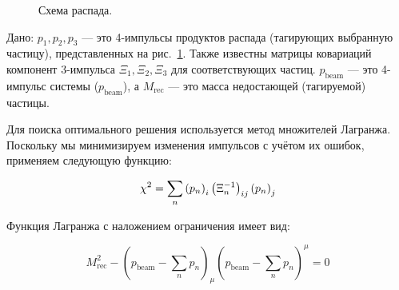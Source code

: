 
\begin{figure}[h!]
    \centering
    \caption{Схема распада.}
    \label{fit_tag}
\end{figure}

Дано: $p_1, p_2, p_3$ --- это 4-импульсы продуктов распада (тагирующих выбранную частицу), представленных на рис.~\ref{fit_tag}. 
Также известны матрицы ковариаций компонент 3-импульса $\Xi_1, \Xi_2, \Xi_3$ для соответствующих частиц. 
$p_{\text{beam}}$ — это 4-импульс системы ($p_{\text{beam}}$), а $M_{\text{rec}}$ --- это масса недостающей (тагируемой) частицы.

Для поиска оптимального решения используется метод множителей Лагранжа. Поскольку мы минимизируем изменения импульсов с учётом их ошибок, применяем следующую функцию:

\begin{equation}
    \chi^2 = \sum_n \left( p_{n} \right)_i  \left( \Xi_n^{-1} \right)_{ij}  \left( p_{n} \right)_j
\end{equation}

Функция Лагранжа с наложением ограничения имеет вид:

\begin{equation}
    M_{\text{rec}}^2 - (p_{\text{beam}} - \sum_n p_n)_\mu (p_{\text{beam}} - \sum_n p_n)^\mu = 0
\end{equation}

